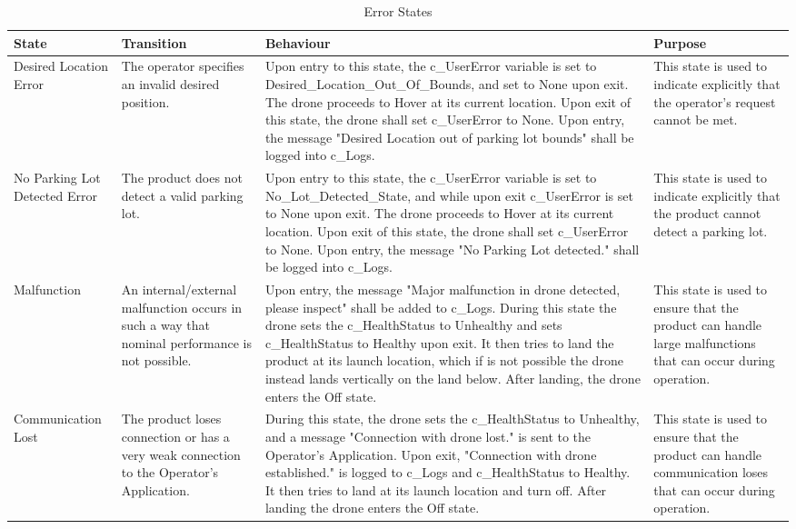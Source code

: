 \documentclass[12pt, titlepage]{article}
\begin{document}
\begin{table}[!h]
\begin{center}
\caption {Error States}
\label{ErrorStates}
\begin{tabular}{ | m{2.7cm} | m{2.3cm} | m{7.5cm} | m{2.5cm} | } 
\hline
 State & Transition & Behaviour & Purpose \\ 
 \hline Desired Location Error &
    The operator specifies an invalid desired position. & 
    Upon entry to this state, the c\_UserError variable is set to Desired\_Location\_Out\_Of\_Bounds, and set to None upon exit. The drone proceeds to Hover at its current location. Upon exit of this state, the drone shall set c\_UserError to None. Upon entry, the message "Desired Location out of parking lot bounds" shall be logged into c\_Logs. & 
    This state is used to indicate explicitly that the operator’s  request cannot be met. \\
\hline No Parking Lot Detected Error & 
    The product does not detect a valid parking lot. & 
    Upon entry to this state, the c\_UserError variable is set to No\_Lot\_Detected\_State, and while upon exit c\_UserError is set to None upon exit. The drone proceeds to Hover at its current location. Upon exit of this state, the drone shall set c\_UserError to None. Upon entry, the message "No Parking Lot detected." shall be logged into c_Logs. & 
    This state is used to indicate explicitly that the product cannot detect a parking lot. \\
\hline Malfunction & 
    An internal/external malfunction occurs in such a way that nominal performance is not possible. & 
    Upon entry, the message "Major malfunction in drone detected, please inspect" shall be added to c\_Logs. During this state the drone sets the c\_HealthStatus to Unhealthy and sets c\_HealthStatus to Healthy upon exit. It then tries to land the product at its launch location, which if is not possible the drone instead lands vertically on the land below. After landing, the drone enters the Off state. &
    This state is used to ensure that the product can handle large malfunctions that can occur during operation. \\
\hline Communication Lost & 
    The product loses connection or has a very weak connection to the Operator's Application. & 
    During this state, the drone sets the c\_HealthStatus to Unhealthy, and a message "Connection with drone lost." is sent to the Operator’s Application. Upon exit, "Connection with drone established." is logged to c\_Logs and c\_HealthStatus to Healthy. It then tries to land at its launch location and turn off. After landing the drone enters the Off state. &
    This state is used to ensure that the product can handle communication loses that can occur during operation. \\
\hline 
\end{tabular}
\end{center}
\end{table}
\end{document}

